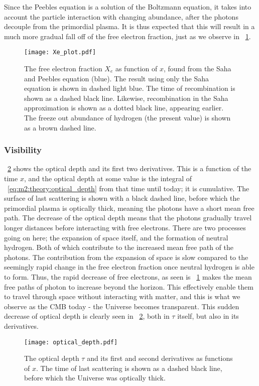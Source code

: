     Since the Peebles equation is a solution of the Boltzmann equation, it takes into account the particle interaction with changing abundance, after the photons decouple from the primordial plasma. It is thus expected that this will result in a much more gradual fall off of the free electron fraction, just as we observe in ~\cref{fig:m2:electron_fraction}.
    \begin{figure}
        \texttt{[image: Xe\_plot.pdf]}
        \caption{The free electron fraction $X_e$ as function of $x$, found from the Saha and Peebles equation (blue). The result using only the Saha equation is shown in dashed light blue. The time of recombination is shown as a dashed black line. Likewise, recombination in the Saha approximation is shown as a dotted black line, appearing earlier. The freeze out abundance of hydrogen (the present value) is shown as a brown dashed line.}
        \label{fig:m2:electron_fraction}
    \end{figure}

    \subsubsection{Visibility}

    ~\cref{fig:m2:optical_depth} shows the optical depth and its first two derivatives. This is a function of the time $x$, and the optical depth at some value is the integral of ~\cref{eq:m2:theory:optical_depth} from that time until today; it is cumulative. The surface of last scattering is shown with a black dashed line, before which the primordial plasma is optically thick, meaning the photons have a short mean free path. The decrease of the optical depth means that the photons gradually travel longer distances before interacting with free electrons. There are two processes going on here; the expansion of space itself, and the formation of neutral hydrogen. Both of which contribute to the increased mean free path of the photons. The contribution from the expansion of space is slow compared to the seemingly rapid change in the free electron fraction once neutral hydrogen is able to form. Thus, the rapid decrease of free electrons, as seen is ~\cref{fig:m2:electron_fraction} makes the mean free paths of photon to increase beyond the horizon. This effectively enable them to travel through space without interacting with matter, and this is what we observe as the CMB today - the Universe becomes transparent. This sudden decrease of optical depth is clearly seen in ~\cref{fig:m2:optical_depth}, both in $\tau$ itself, but also in its derivatives.
    \begin{figure}
        \texttt{[image: optical\_depth.pdf]}
        \caption{The optical depth $\tau$ and its first and second derivatives as functions of $x$. The time of last scattering is shown as a dashed black line, before which the Universe was optically thick.}
        \label{fig:m2:optical_depth}
    \end{figure}

